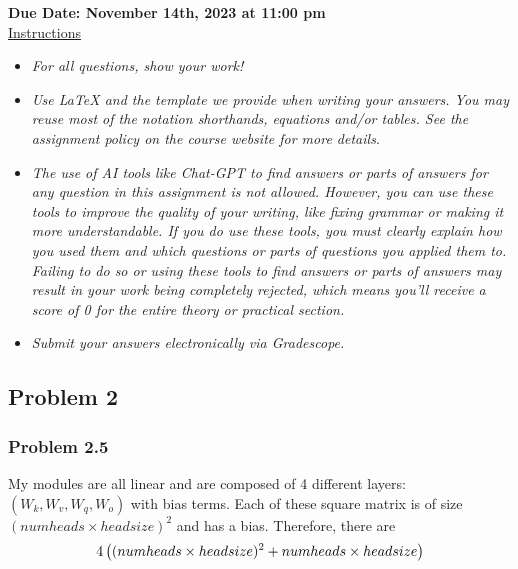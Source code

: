 \documentclass[12pt]{article}
\theoremstyle{definition}
\begin{document}
\fancyhead{}
\fancyfoot{}


\vspace{1cm}

\shorthandoff{:}
{\textbf{Due Date: November 14th, 2023 at 11:00 pm}}\\


\vspace{-0.5cm}
\underline{Instructions}%
\renewcommand{\labelitemi}{\textbullet}

\begin{itemize}
\item \emph{For all questions, show your work!}
\item \emph{Use LaTeX and the template we provide when writing your answers.
You may reuse most of the notation shorthands, equations and/or tables.
See the assignment policy on the course website for more details.}
\item \emph{The use of AI tools like Chat-GPT to find answers or parts of answers for any question in this assignment is not allowed. However, you can use these tools to improve the quality of your writing, like fixing grammar or making it more understandable. If you do use these tools, you must clearly explain how you used them and which questions or parts of questions you applied them to. Failing to do so or using these tools to find answers or parts of answers may result in your work being completely rejected, which means you'll receive a score of 0 for the entire theory or practical section.}
\item \emph{Submit your answers electronically via Gradescope.}
\end{itemize}
\subsection*{Problem 2}
\subsubsection*{Problem 2.5}
My modules are all linear and are composed of 4 different
layers:$(W_{k}, W_{v}, W_{q}, W_{o})$ with bias terms. Each of these square matrix is
of size $(numheads \times headsize)^{2}$ and has a bias. Therefore, there are
$$4 \left( (numheads \times headsize)^{2} + numheads \times headsize \right)$$
\end{document}
